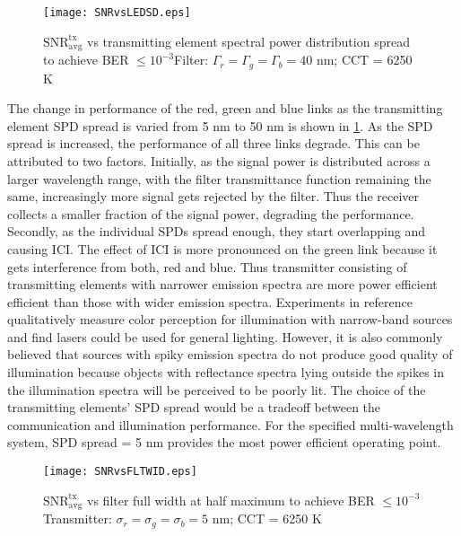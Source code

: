 \begin{figure}[!b]
	\centering
		\texttt{[image: SNRvsLEDSD.eps]}
	\caption{$\text{SNR}^{\text{tx}}_{\text{avg}}$ vs transmitting element spectral power distribution spread to achieve BER $\leq 10^{-3}$\newline Filter: $\Gamma_r = \Gamma_g = \Gamma_b = 40$ nm; CCT = 6250 K}
	\label{fig:SNRvsLEDSD}
\end{figure}

The change in performance of the red, green and blue links as the transmitting element SPD spread is varied from 5 nm to 50 nm is shown in \figurename{\ref{fig:SNRvsLEDSD}}. As the SPD spread is increased, the performance of all three links degrade. This can be attributed to two factors. Initially, as the signal power is distributed across a larger wavelength range, with the filter transmittance function remaining the same, increasingly more signal gets rejected by the filter. Thus the receiver collects a smaller fraction of the signal power, degrading the performance. Secondly, as the individual SPDs spread enough, they start overlapping and causing ICI. The effect of ICI is more pronounced on the green link because it gets interference from both, red and blue. Thus transmitter consisting of transmitting elements with narrower emission spectra are more power efficient efficient than those with wider emission spectra. Experiments in reference \cite{neu11a} qualitatively measure color perception for illumination with narrow-band sources and find lasers could be used for general lighting. However, it is also commonly believed that sources with spiky emission spectra do not produce good quality of illumination because objects with reflectance spectra lying outside the spikes in the illumination spectra will be perceived to be poorly lit. The choice of the transmitting elements' SPD spread would be a tradeoff between the communication and illumination performance. For the specified multi-wavelength system, SPD spread = 5 nm provides the most power efficient operating point.

\begin{figure}[!t]
	\centering
		\texttt{[image: SNRvsFLTWID.eps]}
	\caption{$\text{SNR}^{\text{tx}}_{\text{avg}}$ vs filter full width at half maximum to achieve BER $\leq 10^{-3}$\newline Transmitter: $\sigma_r = \sigma_g = \sigma_b = 5$ nm; CCT = 6250 K}
	\label{fig:SNRvsFLTWID}
\end{figure}

